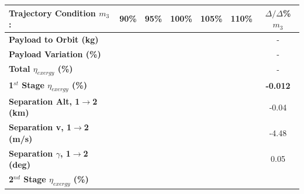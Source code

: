 \begin{table}[ht]%
	\centering
	\begin{tabular}{l c c c c c c} 
		\hline \textbf{Trajectory Condition}   \qquad  $m_{3}$:
		&90\%
		&95\%
		&100\%
		&105\%
		&110\%
		& $\Delta/\Delta$\%$m_{3}$
		\\
		\hline \textbf{Payload to Orbit (kg)}
		& \textbf{\PayloadToOrbitmThreeNinety}
		& \textbf{\PayloadToOrbitmThreeNinetyFive}
		& \textbf{\PayloadToOrbitmThreeStandard}
		& \textbf{\PayloadToOrbitmThreeOneHundredFive}
		& \textbf{\PayloadToOrbitmThreeOneHundredTen}
		& -
		\\
		\textbf{Payload Variation (\%)}
		& \PayloadVarmThreeNinety
		& \PayloadVarmThreeNinetyFive
		& \PayloadVarmThreeStandard
		& \PayloadVarmThreeOneHundredFive
		& \PayloadVarmThreeOneHundredTen
		& -
		\\
		\textbf{Total $\eta_{exergy}$ (\%)}
		& \textbf{\totalExergyEffmThreeNinety}
		& \textbf{\totalExergyEffmThreeNinetyFive}
		& \textbf{\totalExergyEffmThreeStandard}
		& \textbf{\totalExergyEffmThreeOneHundredFive}
		& \textbf{\totalExergyEffmThreeOneHundredTen}
		& -
		\\
		\hline 
		\textbf{1$^{st}$ Stage $\eta_{exergy}$ (\%)}
		& \textbf{\firstExergyEffmThreeNinety}
		& \textbf{\firstExergyEffmThreeNinetyFive}
		& \textbf{\firstExergyEffmThreeStandard}
		& \textbf{\firstExergyEffmThreeOneHundredFive}
		& \textbf{\firstExergyEffmThreeOneHundredTen}
		& \textbf{-0.012}
		\\
		\textbf{Separation Alt, 1$\rightarrow$2 (km)}
		& \firstsecondSeparationAltmThreeNinety
		& \firstsecondSeparationAltmThreeNinetyFive
		& \firstsecondSeparationAltmThreeStandard
		& \firstsecondSeparationAltmThreeOneHundredFive
		& \firstsecondSeparationAltmThreeOneHundredTen
		&-0.04
		\\
		\textbf{Separation v, 1$\rightarrow$2 (m/s)}
		& \firstsecondSeparationvmThreeNinety
		& \firstsecondSeparationvmThreeNinetyFive
		& \firstsecondSeparationvmThreeStandard
		& \firstsecondSeparationvmThreeOneHundredFive
		& \firstsecondSeparationvmThreeOneHundredTen
		&-4.48
		\\
		\textbf{Separation $\gamma$, 1$\rightarrow$2 (deg)}
		& \firstsecondSeparationgammamThreeNinety
		& \firstsecondSeparationgammamThreeNinetyFive
		& \firstsecondSeparationgammamThreeStandard
		& \firstsecondSeparationgammamThreeOneHundredFive
		& \firstsecondSeparationgammamThreeOneHundredTen
		&0.05
		\\
		\hline 
		\textbf{2$^{nd}$ Stage $\eta_{exergy}$ (\%)}

\end{tabular}
\end{table}

